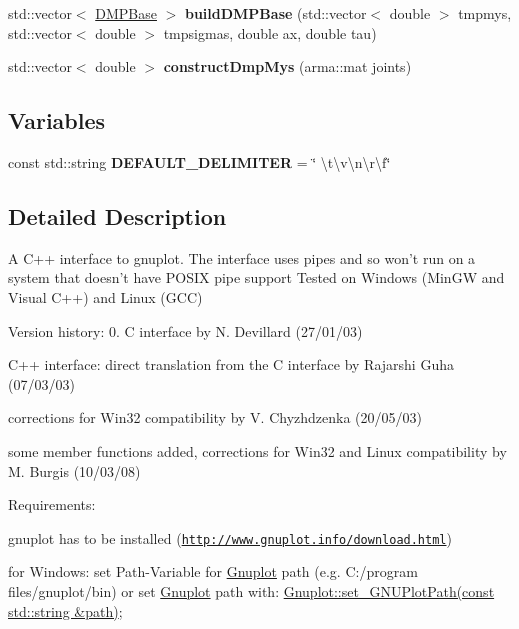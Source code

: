 \begin{DoxyCompactItemize}
\item 
\hypertarget{namespacekukadu_a579c6b9f3e0e71d5e90eb37df6dde59a}{std\-::vector$<$ \hyperlink{classkukadu_1_1DMPBase}{D\-M\-P\-Base} $>$ {\bfseries build\-D\-M\-P\-Base} (std\-::vector$<$ double $>$ tmpmys, std\-::vector$<$ double $>$ tmpsigmas, double ax, double tau)}\label{namespacekukadu_a579c6b9f3e0e71d5e90eb37df6dde59a}

\item 
\hypertarget{namespacekukadu_ac6a00fd5f5cdefd48a21fa31e11544be}{std\-::vector$<$ double $>$ {\bfseries construct\-Dmp\-Mys} (arma\-::mat joints)}\label{namespacekukadu_ac6a00fd5f5cdefd48a21fa31e11544be}

\end{DoxyCompactItemize}
\subsection*{Variables}
\begin{DoxyCompactItemize}
\item 
\hypertarget{namespacekukadu_a627d5cc15a5c553b373f2e781bd4b338}{const std\-::string {\bfseries D\-E\-F\-A\-U\-L\-T\-\_\-\-D\-E\-L\-I\-M\-I\-T\-E\-R} = \char`\"{} \textbackslash{}t\textbackslash{}v\textbackslash{}n\textbackslash{}r\textbackslash{}f\char`\"{}}\label{namespacekukadu_a627d5cc15a5c553b373f2e781bd4b338}

\end{DoxyCompactItemize}


\subsection{Detailed Description}
A C++ interface to gnuplot. The interface uses pipes and so won't run on a system that doesn't have P\-O\-S\-I\-X pipe support Tested on Windows (Min\-G\-W and Visual C++) and Linux (G\-C\-C)

Version history\-: 0. C interface by N. Devillard (27/01/03)
\begin{DoxyEnumerate}
\item C++ interface\-: direct translation from the C interface by Rajarshi Guha (07/03/03)
\item corrections for Win32 compatibility by V. Chyzhdzenka (20/05/03)
\item some member functions added, corrections for Win32 and Linux compatibility by M. Burgis (10/03/08)
\end{DoxyEnumerate}

Requirements\-:
\begin{DoxyItemize}
\item gnuplot has to be installed (\href{http://www.gnuplot.info/download.html}{\tt http\-://www.\-gnuplot.\-info/download.\-html})
\item for Windows\-: set Path-\/\-Variable for \hyperlink{classkukadu_1_1Gnuplot}{Gnuplot} path (e.\-g. C\-:/program files/gnuplot/bin) or set \hyperlink{classkukadu_1_1Gnuplot}{Gnuplot} path with\-: \hyperlink{classkukadu_1_1Gnuplot_a04d7a36bbe70dcb878a1ae5d8299d012}{Gnuplot\-::set\-\_\-\-G\-N\-U\-Plot\-Path(const std\-::string \&path)}; 
\end{DoxyItemize}